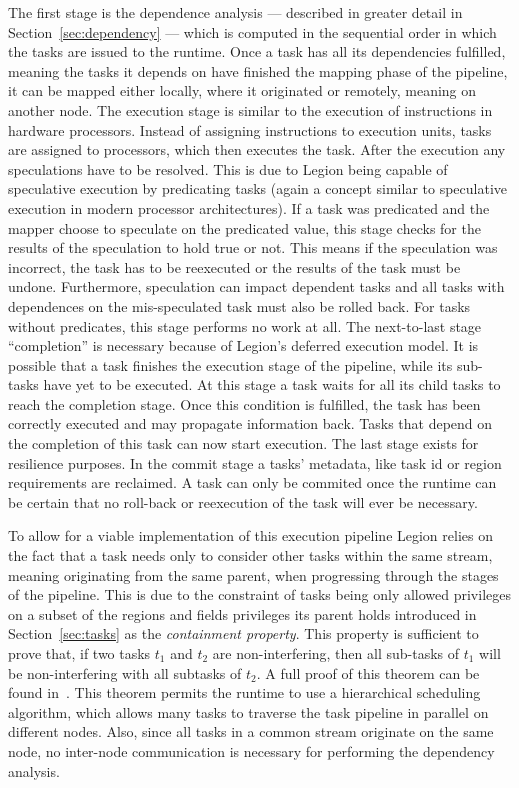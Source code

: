 \documentclass{article}      %
\begin{document}
The first stage is the dependence analysis --- described in greater detail in Section~\ref{sec:dependency} --- which is computed in the sequential order in which the tasks are issued to the runtime. Once a task has all its dependencies fulfilled, meaning the tasks it depends on have finished the mapping phase of the pipeline, it can be mapped either locally, where it originated or remotely, meaning on another node.
The execution stage is similar to the execution of instructions in hardware processors. Instead of assigning instructions to execution units, tasks are assigned to processors, which then executes the task.
After the execution any speculations have to be resolved. 
This is due to Legion being capable of speculative execution by predicating tasks (again a concept similar to speculative execution in modern processor architectures).
If a task was predicated and the mapper choose to speculate on the predicated value, this stage checks for the results of the speculation to hold true or not. 
This means if the speculation was incorrect, the task has to be reexecuted or the results of the task must be undone. 
Furthermore, speculation can impact dependent tasks and all tasks with dependences on the mis-speculated task must also be rolled back. For tasks without predicates, this stage performs no work at all. The next-to-last stage ``completion'' is necessary because of Legion's deferred execution model. It is possible that a task finishes the execution stage of the pipeline, while its sub-tasks have yet to be executed. At this stage a task waits for all its child tasks to reach the completion stage. Once this condition is fulfilled, the task has been correctly executed and may propagate information back. Tasks that depend on the completion of this task can now start execution. The last stage exists for resilience purposes. In the commit stage a tasks' metadata, like task id or region requirements are reclaimed. A task can only be commited once the runtime can be certain that no roll-back or reexecution of the task will ever be necessary.

To allow for a viable implementation of this execution pipeline Legion relies on the fact that a task needs only to consider other tasks within the same stream, meaning originating from the same parent, when progressing through the stages of the pipeline. This is due to the constraint of tasks being only allowed privileges on a subset of the regions and fields privileges its parent holds introduced in Section~\ref{sec:tasks} as the \emph{containment property}. This property is sufficient to prove that, if two tasks $t_1$ and $t_2$ are non-interfering, then all sub-tasks of $t_1$ will be non-interfering with all subtasks of $t_2$. A full proof of this theorem can be found in~\cite{LanguageSupport}. This theorem permits the runtime to use a hierarchical scheduling algorithm, which allows many tasks to traverse the task pipeline in parallel on different nodes. Also, since all tasks in a common stream originate on the same node, no inter-node communication is necessary for performing the dependency analysis.
\end{document}
